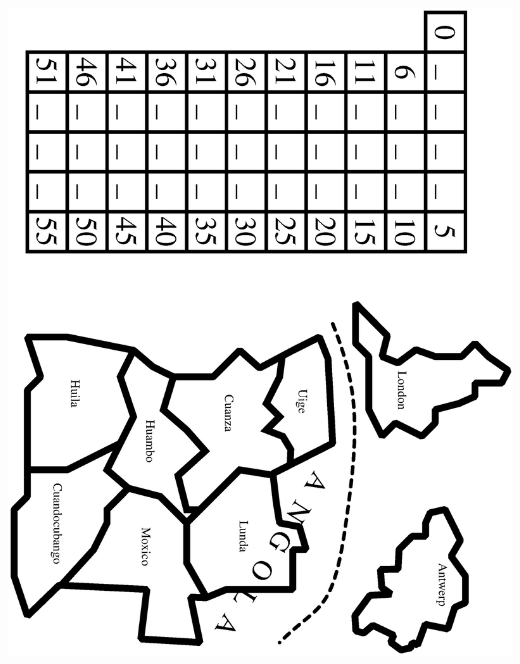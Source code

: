 \documentclass[12pt]{article}
\begin{document}
\begin{center}
\includegraphics[width=8in]{decisonSheet.eps}

\vfill

\newpage


\end{center}
\end{document}
